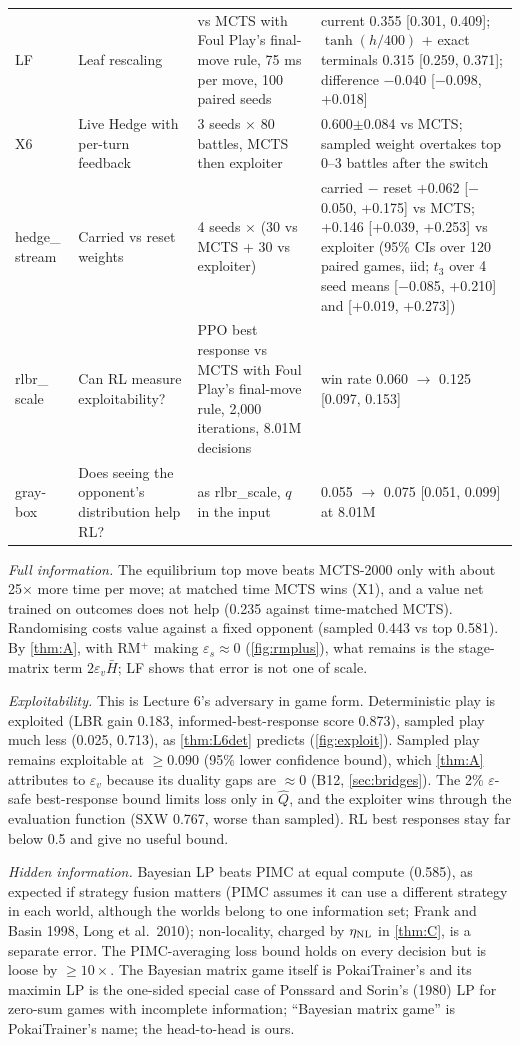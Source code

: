 \documentclass[10pt]{article}
\theoremstyle{plain}
\theoremstyle{definition}
\theoremstyle{remark}
\newcommand{\epss}{\varepsilon_s}
\newcommand{\epsv}{\varepsilon_v}
\newcommand{\Hbar}{\bar H}
\newcommand{\Qhat}{\hat Q}
\begin{document}
\begin{longtable}{@{}p{1.3cm}p{3.6cm}p{4.2cm}p{7.0cm}@{}}
LF & Leaf rescaling & vs MCTS with Foul Play's final-move rule, 75 ms per move, 100 paired seeds & current 0.355 [0.301, 0.409]; $\tanh(h/400)$ + exact terminals 0.315 [0.259, 0.371]; difference $-0.040$ [$-0.098$, +0.018] \\
X6 & Live Hedge with per-turn feedback & 3 seeds $\times$ 80 battles, MCTS then exploiter & 0.600$\pm$0.084 vs MCTS; sampled weight overtakes top 0--3 battles after the switch \\
hedge\_ stream & Carried vs reset weights & 4 seeds $\times$ (30 vs MCTS + 30 vs exploiter) & carried $-$ reset +0.062 [$-$0.050, +0.175] vs MCTS; +0.146 [+0.039, +0.253] vs exploiter (95\% CIs over 120 paired games, iid; $t_3$ over 4 seed means [$-$0.085, +0.210] and [+0.019, +0.273]) \\
rlbr\_ scale & Can RL measure exploitability? & PPO best response vs MCTS with Foul Play's final-move rule, 2,000 iterations, 8.01M decisions & win rate 0.060 $\to$ 0.125 [0.097, 0.153] \\
gray-box & Does seeing the opponent's distribution help RL? & as rlbr\_scale, $q$ in the input & 0.055 $\to$ 0.075 [0.051, 0.099] at 8.01M \\
\bottomrule
\end{longtable}
\endgroup

\emph{Full information.} The equilibrium top move beats MCTS-2000 only with about 25$\times$ more time per move; at
matched time MCTS wins (X1), and a value net trained on outcomes does not help (0.235 against time-matched MCTS).
Randomising costs value against a fixed opponent (sampled 0.443 vs top 0.581). By \cref{thm:A}, with RM$^+$ making
$\epss\approx0$ (\cref{fig:rmplus}), what remains is the stage-matrix term $2\epsv\Hbar$; LF shows that error is not one of scale.

\emph{Exploitability.} This is Lecture 6's adversary in game form. Deterministic play is exploited (LBR gain 0.183,
informed-best-response score 0.873), sampled play much less (0.025, 0.713), as \cref{thm:L6det} predicts (\cref{fig:exploit}). Sampled
play remains exploitable at $\ge0.090$ (95\% lower confidence bound), which \cref{thm:A} attributes to $\epsv$ because its duality gaps are
$\approx0$ (B12, \cref{sec:bridges}). The 2\% $\varepsilon$-safe best-response bound limits loss only in $\Qhat$, and the
exploiter wins through the evaluation function (SXW 0.767, worse than sampled). RL best responses stay far below 0.5 and give no
useful bound.

\emph{Hidden information.} Bayesian LP beats PIMC at equal compute (0.585), as expected if strategy fusion matters (PIMC assumes it can use a different strategy in each world, although the worlds belong to one information set; Frank and Basin 1998, Long et al.\ 2010); non-locality, charged by $\eta_{\rm NL}$ in \cref{thm:C}, is a separate error. The PIMC-averaging loss bound holds on every decision but is loose by $\ge10\times$. The Bayesian matrix game itself is
PokaiTrainer's and its maximin LP is the one-sided special case of Ponssard and Sorin's (1980) LP for zero-sum games with incomplete information; ``Bayesian matrix game'' is PokaiTrainer's name; the head-to-head is ours.
\end{document}
